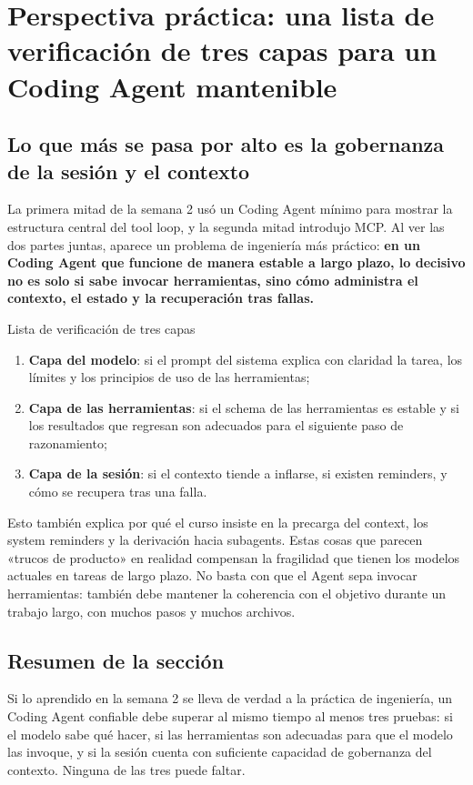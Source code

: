 \section{Perspectiva práctica: una lista de verificación de tres capas para un Coding Agent mantenible}

\subsection{Lo que más se pasa por alto es la gobernanza de la sesión y el contexto}
La primera mitad de la semana 2 usó un Coding Agent mínimo para mostrar la estructura central del tool loop, y la segunda mitad introdujo MCP. Al ver las dos partes juntas, aparece un problema de ingeniería más práctico: \textbf{en un Coding Agent que funcione de manera estable a largo plazo, lo decisivo no es solo si sabe invocar herramientas, sino cómo administra el contexto, el estado y la recuperación tras fallas.}

\begin{knowledgebox}{Lista de verificación de tres capas}
\begin{enumerate}
    \item \textbf{Capa del modelo}: si el prompt del sistema explica con claridad la tarea, los límites y los principios de uso de las herramientas;
    \item \textbf{Capa de las herramientas}: si el schema de las herramientas es estable y si los resultados que regresan son adecuados para el siguiente paso de razonamiento;
    \item \textbf{Capa de la sesión}: si el contexto tiende a inflarse, si existen reminders, y cómo se recupera tras una falla.
\end{enumerate}
\end{knowledgebox}

Esto también explica por qué el curso insiste en la precarga del context, los system reminders y la derivación hacia subagents. Estas cosas que parecen «trucos de producto» en realidad compensan la fragilidad que tienen los modelos actuales en tareas de largo plazo. No basta con que el Agent sepa invocar herramientas: también debe mantener la coherencia con el objetivo durante un trabajo largo, con muchos pasos y muchos archivos.

\subsection{Resumen de la sección}
Si lo aprendido en la semana 2 se lleva de verdad a la práctica de ingeniería, un Coding Agent confiable debe superar al mismo tiempo al menos tres pruebas: si el modelo sabe qué hacer, si las herramientas son adecuadas para que el modelo las invoque, y si la sesión cuenta con suficiente capacidad de gobernanza del contexto. Ninguna de las tres puede faltar.

